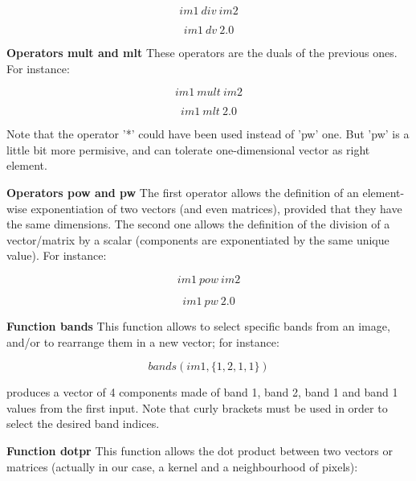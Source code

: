 \begin{equation}
	im1 ~ div ~ im2
\end{equation}

\begin{equation}
	im1 ~ dv ~ 2.0
\end{equation}

\textbf{Operators mult and mlt} \newline
These operators are the duals of the previous ones. For instance:

\begin{equation}
	im1 ~  mult ~ im2
\end{equation}
 
\begin{equation}
	im1 ~  mlt ~ 2.0
\end{equation}

Note that the operator '*' could have been used instead of 'pw' one. But 'pw' is a little bit more permisive, and can tolerate one-dimensional vector as right element.

\textbf{Operators pow and pw} \newline
The first operator allows the definition of an element-wise exponentiation of two vectors (and even matrices), provided that they have the same dimensions.
The second one allows the definition of the division of a vector/matrix by a scalar (components are exponentiated by the same unique value). For instance: 

\begin{equation}
	im1 ~ pow ~ im2
\end{equation}

\begin{equation}
	im1 ~ pw ~ 2.0
\end{equation}

\textbf{Function bands} \newline
This function allows to select specific bands from an image, and/or to rearrange them in a new vector; for instance:

\begin{equation}
  bands(im1,\{1,2,1,1\})
\end{equation}

produces a vector of 4 components made of band 1, band 2, band 1 and band 1 values from the first input. Note that curly brackets must be used in order to select the desired band indices.

\textbf{Function dotpr } \newline
This function allows the dot product between two vectors or matrices (actually in our case, a kernel and a neighbourhood of pixels):

